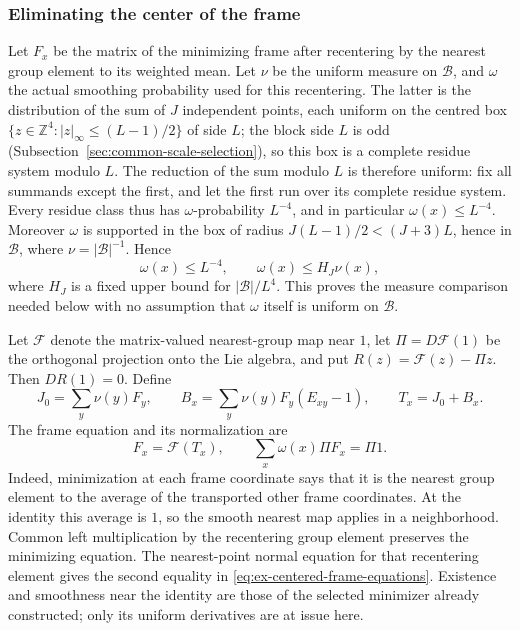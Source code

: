\subsubsection{Eliminating the center of the frame}
Let $F_x$ be the matrix of the minimizing frame after recentering by
the nearest group element to its weighted mean. Let $\nu$ be the uniform
measure on $\mathcal B$, and $\omega$ the actual smoothing probability
used for this recentering. The latter is the distribution of the sum of
$J$ independent points, each uniform on the centred box
$\{z\in\mathbb Z^4:|z|_\infty\leq(L-1)/2\}$ of side $L$; the block side
$L$ is odd (Subsection~\ref{sec:common-scale-selection}), so this box is a complete residue system modulo $L$. The
reduction of the sum modulo $L$ is therefore uniform: fix all summands
except the first, and let the first run over its complete residue
system. Every residue class thus has $\omega$-probability $L^{-4}$, and
in particular $\omega(x)\leq L^{-4}$. Moreover $\omega$ is supported in
the box of radius $J(L-1)/2<(J+3)L$, hence in $\mathcal B$, where
$\nu=|\mathcal B|^{-1}$. Hence
\[
 \omega(x)\leq L^{-4},\qquad
          \omega(x)\leq H_J\nu(x),
\]
where $H_J$ is a fixed upper bound for $|\mathcal B|/L^4$.
This proves the measure comparison needed below with no assumption that
$\omega$ itself is uniform on $\mathcal B$.

Let $\mathcal F$ denote the matrix-valued nearest-group map near $1$,
let $\Pi=D\mathcal F(1)$ be the orthogonal projection onto the Lie
algebra, and put $R(z)=\mathcal F(z)-\Pi z$. Then $DR(1)=0$.
Define
\[
 J_0=\sum_y\nu(y)F_y,\qquad
 B_x=\sum_y\nu(y)F_y(E_{xy}-1),\qquad T_x=J_0+B_x.
\]
The frame equation and its normalization are
\begin{equation}\label{eq:ex-centered-frame-equations}
       F_x=\mathcal F(T_x),\qquad
       \sum_x\omega(x)\Pi F_x=\Pi1.
\end{equation}
Indeed, minimization at each frame coordinate says that it is the
nearest group element to the average of the transported other frame
coordinates. At the identity this average is $1$, so the smooth nearest
map applies in a neighborhood. Common left multiplication by the
recentering group element preserves the minimizing equation. The
nearest-point normal equation for that recentering element gives the
second equality in \eqref{eq:ex-centered-frame-equations}.
Existence and smoothness near the identity are those of the selected
minimizer already constructed; only its uniform derivatives are at
issue here.

